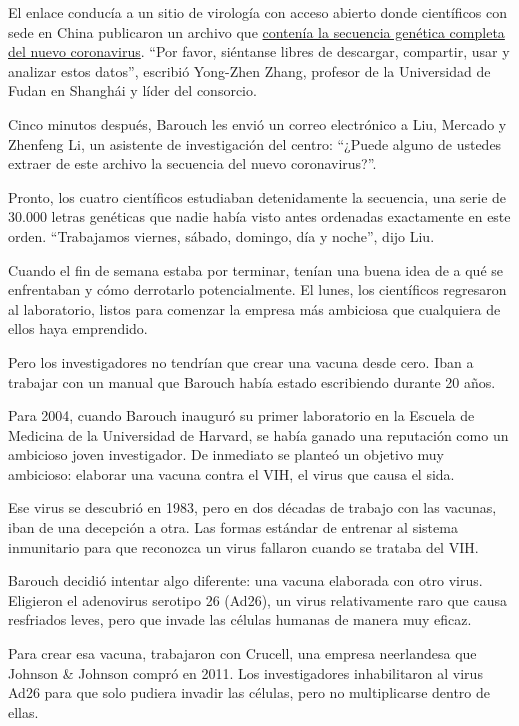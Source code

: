 El enlace conducía a un sitio de virología con acceso abierto donde
científicos con sede en China publicaron un archivo que
\href{https://virological.org/t/novel-2019-coronavirus-genome/319}{contenía
la secuencia genética completa del nuevo coronavirus}. ``Por favor,
siéntanse libres de descargar, compartir, usar y analizar estos datos'',
escribió Yong-Zhen Zhang, profesor de la Universidad de Fudan en
Shanghái y líder del consorcio.

Cinco minutos después, Barouch les envió un correo electrónico a Liu,
Mercado y Zhenfeng Li, un asistente de investigación del centro:
``¿Puede alguno de ustedes extraer de este archivo la secuencia del
nuevo coronavirus?''.

Pronto, los cuatro científicos estudiaban detenidamente la secuencia,
una serie de 30.000 letras genéticas que nadie había visto antes
ordenadas exactamente en este orden. ``Trabajamos viernes, sábado,
domingo, día y noche'', dijo Liu.

Cuando el fin de semana estaba por terminar, tenían una buena idea de a
qué se enfrentaban y cómo derrotarlo potencialmente. El lunes, los
científicos regresaron al laboratorio, listos para comenzar la empresa
más ambiciosa que cualquiera de ellos haya emprendido.

Pero los investigadores no tendrían que crear una vacuna desde cero.
Iban a trabajar con un manual que Barouch había estado escribiendo
durante 20 años.

Para 2004, cuando Barouch inauguró su primer laboratorio en la Escuela
de Medicina de la Universidad de Harvard, se había ganado una reputación
como un ambicioso joven investigador. De inmediato se planteó un
objetivo muy ambicioso: elaborar una vacuna contra el VIH, el virus que
causa el sida.

Ese virus se descubrió en 1983, pero en dos décadas de trabajo con las
vacunas, iban de una decepción a otra. Las formas estándar de entrenar
al sistema inmunitario para que reconozca un virus fallaron cuando se
trataba del VIH.

Barouch decidió intentar algo diferente: una vacuna elaborada con otro
virus. Eligieron el adenovirus serotipo 26 (Ad26), un virus
relativamente raro que causa resfriados leves, pero que invade las
células humanas de manera muy eficaz.

Para crear esa vacuna, trabajaron con Crucell, una empresa neerlandesa
que Johnson \& Johnson compró en 2011. Los investigadores inhabilitaron
al virus Ad26 para que solo pudiera invadir las células, pero no
multiplicarse dentro de ellas.


